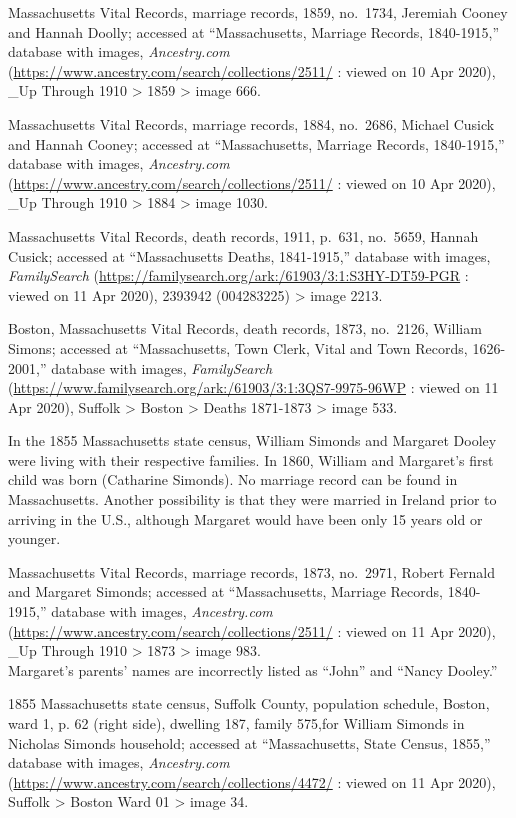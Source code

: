 \begin{thebibliography}{999}
	Massachusetts Vital Records, marriage records, 1859, no.\ 1734, Jeremiah Cooney and Hannah Doolly; accessed at ``Massachusetts, Marriage Records, 1840-1915,'' database with images, \textit{Ancestry.com} (\url{https://www.ancestry.com/search/collections/2511/} : viewed on 10 Apr 2020), \_Up Through 1910 > 1859 > image 666.
	
	Massachusetts Vital Records, marriage records, 1884, no.\ 2686, Michael Cusick and Hannah Cooney; accessed at ``Massachusetts, Marriage Records, 1840-1915,'' database with images, \textit{Ancestry.com} (\url{https://www.ancestry.com/search/collections/2511/} : viewed on 10 Apr 2020), \_Up Through 1910 > 1884 > image 1030.
	
	Massachusetts Vital Records, death records, 1911, p.\ 631, no.\ 5659, Hannah Cusick; accessed at ``Massachusetts Deaths, 1841-1915,'' database with images, \textit{FamilySearch} (\url{https://familysearch.org/ark:/61903/3:1:S3HY-DT59-PGR} : viewed on 11 Apr 2020), 2393942 (004283225) > image 2213.
	
	Boston, Massachusetts Vital Records, death records, 1873, no.\ 2126, William Simons; accessed at ``Massachusetts, Town Clerk, Vital and Town Records, 1626-2001,'' database with images, \textit{FamilySearch} (\url{https://www.familysearch.org/ark:/61903/3:1:3QS7-9975-96WP} : viewed on 11 Apr 2020), Suffolk > Boston > Deaths 1871-1873 > image 533.
	
	In the 1855 Massachusetts state census, William Simonds and Margaret Dooley were living with their respective families. In 1860, William and Margaret's first child was born (Catharine Simonds). No marriage record can be found in Massachusetts. Another possibility is that they were married in Ireland prior to arriving in the U.S., although Margaret would have been only 15 years old or younger.
	
	Massachusetts Vital Records, marriage records, 1873, no.\ 2971, Robert Fernald and Margaret Simonds; accessed at ``Massachusetts, Marriage Records, 1840-1915,'' database with images, \textit{Ancestry.com} (\url{https://www.ancestry.com/search/collections/2511/} : viewed on 11 Apr 2020), \_Up Through 1910 > 1873 > image 983.\\
	Margaret's parents' names are incorrectly listed as ``John'' and ``Nancy Dooley.''
	
	1855 Massachusetts state census, Suffolk County, population schedule, Boston, ward 1, p. 62 (right side), dwelling 187, family 575,for William Simonds in Nicholas Simonds household; accessed at ``Massachusetts, State Census, 1855,'' database with images, \textit{Ancestry.com} (\url{https://www.ancestry.com/search/collections/4472/} : viewed on 11 Apr 2020), Suffolk > Boston Ward 01 > image 34.
	

\end{thebibliography}
